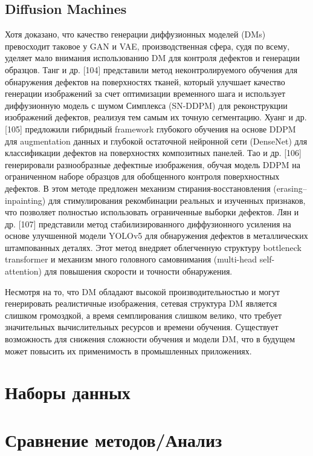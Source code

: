 \documentclass[14pt,a4paper]{article}
\begin{document}
\subsection{Diffusion Machines}

Хотя доказано, что качество генерации диффузионных моделей (DMs) превосходит таковое у GAN и VAE, производственная сфера, судя по всему, уделяет мало внимания использованию DM для контроля дефектов и генерации образцов. Танг и др. [104] представили метод неконтролируемого обучения для обнаружения дефектов на поверхностях тканей, который улучшает качество генерации изображений за счет оптимизации временного шага и использует диффузионную модель с шумом Симплекса (SN-DDPM) для реконструкции изображений дефектов, реализуя тем самым их точную сегментацию. Хуанг и др. [105] предложили гибридный framework глубокого обучения на основе DDPM для augmentation данных и глубокой остаточной нейронной сети (DenseNet) для классификации дефектов на поверхностях композитных панелей. Тао и др. [106] генерировали разнообразные дефектные изображения, обучая модель DDPM на ограниченном наборе образцов для обобщенного контроля поверхностных дефектов. В этом методе предложен механизм стирания-восстановления (erasing–inpainting) для стимулирования рекомбинации реальных и изученных признаков, что позволяет полностью использовать ограниченные выборки дефектов. Лян и др. [107] представили метод стабилизированного диффузионного усиления на основе улучшенной модели YOLOv5 для обнаружения дефектов в металлических штампованных деталях. Этот метод внедряет облегченную структуру bottleneck transformer и механизм много головного самовнимания (multi-head self-attention) для повышения скорости и точности обнаружения.

Несмотря на то, что DM обладают высокой производительностью и могут генерировать реалистичные изображения, сетевая структура DM является слишком громоздкой, а время семплирования слишком велико, что требует значительных вычислительных ресурсов и времени обучения. Существует возможность для снижения сложности обучения и модели DM, что в будущем может повысить их применимость в промышленных приложениях. \cite{YuHe2024}

\section{Наборы данных}


\section{Сравнение методов/Анализ}
\end{document}

